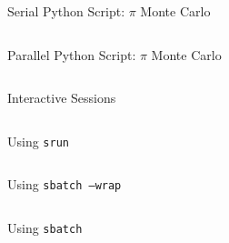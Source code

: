 \documentclass[aspectratio=169]{beamer}
\begin{document}
\begin{frame}{Serial Python Script: \(\pi\) Monte Carlo}
\begin{listing}[H]
\inputminted{python}{examples/slurm_tutorial/pi_monte_carlo.py}
\caption{Serial algorithm to estimate the value of Pi.}
\end{listing}
\end{frame}

\begin{frame}{Parallel Python Script: \(\pi\) Monte Carlo}
\begin{listing}[H]
\inputminted{python}{examples/slurm_tutorial/pi_monte_carlo_shared.py}
\caption{Parallel algorithm to estimate the value of Pi.}
\end{listing}
\end{frame}

\begin{frame}{Interactive Sessions}
\begin{listing}[H]
\inputminted{sh}{examples/slurm_tutorial/01_interactive_session}
\caption{Using \texttt{srun} to log into a compute node to run commands interactively.}
\end{listing}
\end{frame}

\begin{frame}{Using \texttt{srun}}
\begin{listing}[H]
\inputminted{sh}{examples/slurm_tutorial/02_srun}
\caption{Using \texttt{srun} to run commands directly on a compute node.}
\end{listing}
\end{frame}

\begin{frame}{Using \texttt{sbatch --wrap}}
\begin{listing}[H]
\inputminted{sh}{examples/slurm_tutorial/03_sbatch_wrap}
\caption{Using \texttt{sbatch --wrap} wrap a commands in an \texttt{sbatch} script that is then submitted to the queue can run non-interactively.}
\end{listing}
\end{frame}

\begin{frame}{Using \texttt{sbatch}}
\begin{listing}[H]
\inputminted{sh}{examples/slurm_tutorial/04_sbatch_htc.sbatch}
\caption{Using \texttt{sbatch} run serial computations via an \texttt{sbatch} script.}
\end{listing}
\end{frame}
\end{document}
